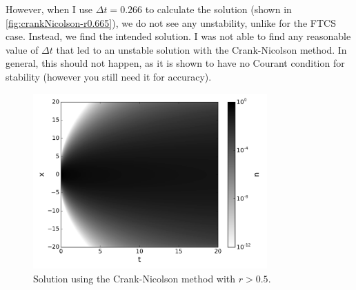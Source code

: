 \documentclass[12pt]{article}
\begin{document}
However, when I use $\Delta t = 0.266$ to calculate the solution (shown in
\autoref{fig:crankNicolson-r0.665}), we do not see any unstability, unlike
for the FTCS case. Instead, we find the intended solution. I was not able to
find any reasonable value of $\Delta t$ that led to an unstable solution with
the Crank-Nicolson method. In general, this should not happen, as it is shown
to have no Courant condition for stability (however you still need it for
accuracy).

\begin{figure}[ht]
    \centering
    \includegraphics[width=0.8\textwidth]{crankNicolson-r0.665}
    \caption{Solution using the Crank-Nicolson method with $r > 0.5$.}
    \label{fig:crankNicolson-r0.665}
\end{figure}
\end{document}

